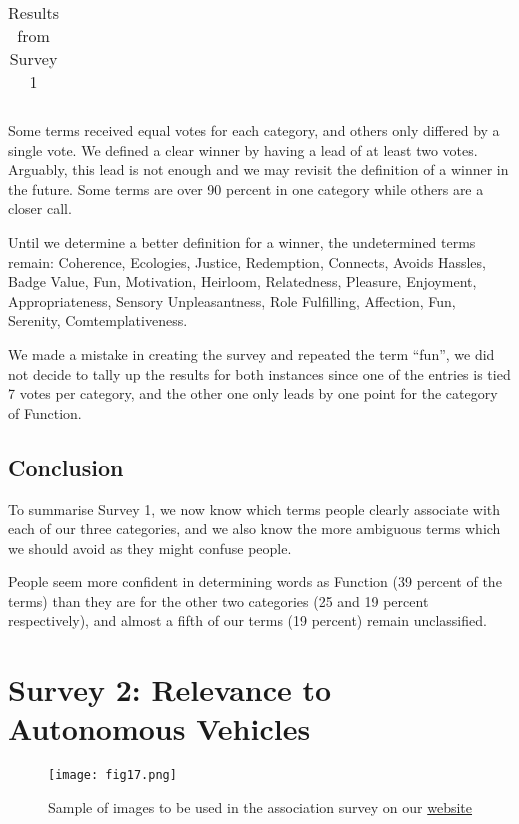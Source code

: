 \documentclass[12pt, usenames, dvipsnames]{report}
\begin{document}
\begin{flushleft}
\begin{table}[h!]
\begin{tabular}{@{}>{\raggedright}p{5cm}>{\raggedright}p{5cm}>{\raggedright\arraybackslash}p{5cm}@{}}
                                                                               
\\ \midrule
\end{tabular}
\caption{Results from Survey 1}
\label{tab:survey1-results}
\end{table}

Some terms received equal votes for each category, and others only differed by a single vote. 
We defined a clear winner by having a lead of at least two votes.
Arguably, this lead is not enough and we may revisit the definition of a winner in the future.
Some terms are over 90 percent in one category while others are a closer call.

Until we determine a better definition for a winner, the undetermined terms remain: 
Coherence,
Ecologies,
Justice,
Redemption,
Connects,
Avoids Hassles,
Badge Value,
Fun,
Motivation,
Heirloom,
Relatedness,
Pleasure,
Enjoyment,
Appropriateness,
Sensory Unpleasantness,
Role Fulfilling,
Affection,
Fun,
Serenity,
Comtemplativeness.

We made a mistake in creating the survey and repeated the term ``fun'', we did not decide to tally up the results for both instances since one of the entries is tied 7 votes per category, and the other one only leads by one point for the category of Function.

\subsection{Conclusion}

To summarise Survey 1, we now know which terms people clearly associate with each of our three categories, and we also know the more ambiguous terms which we should avoid as they might confuse people.

People seem more confident in determining words as Function (39 percent of the terms) than they are for the other two categories (25 and 19 percent respectively), and almost a fifth of our terms (19 percent) remain unclassified.


\section{Survey 2: Relevance to Autonomous Vehicles}

\vspace*{0.5em}
\begin{figure}[!htbp]
  \hspace*{-3.666em}
  \texttt{[image: fig17.png]}
  \caption{Sample of images to be used in the association survey on our \href{https://meaning.pub}{website}}
  \label{fig:figure17}
\end{figure}
\vspace*{0.5em}


\end{flushleft}
\end{document}
